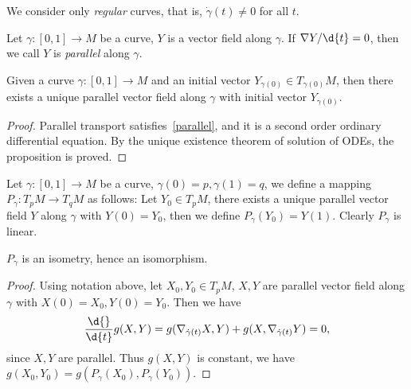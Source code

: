 \begin{rem}
    We consider only \emph{regular} curves, that is, $\dot\gamma(t)\neq 0$ for all $t$.
\end{rem}

\begin{defn}
    Let $\gamma:[0,1]\to M$ be a curve, $Y$ is a vector field along $\gamma$.
    If $\nabla Y/\d{t}=0$, then we call $Y$ is \emph{parallel} along $\gamma$.
\end{defn}

\begin{prop}\label{parallel transport!existence}
    Given a curve $\gamma:[0,1]\to M$ and an initial vector $Y_{\gamma(0)}\in T_{\gamma(0)}M$, then there exists a unique parallel vector field along $\gamma$ with initial vector $Y_{\gamma(0)}$.
\end{prop}
\begin{proof}
    Parallel transport satisfies~\eqref{parallel}, and it is a second order ordinary differential equation.
    By the unique existence theorem of solution of ODEs, the proposition is proved.
\end{proof}

\begin{defn}
    Let $\gamma:[0,1]\to M$ be a curve, $\gamma(0)=p,\gamma(1)=q$, we define a mapping $P_\gamma:T_pM\to T_qM$ as follows:
    Let $Y_0\in T_pM$, there exists a unique parallel vector field $Y$ along $\gamma$ with $Y(0)=Y_0$, then we define $P_\gamma(Y_0)=Y(1)$.
    Clearly $P_\gamma$ is linear.
\end{defn}

\begin{prop}
    $P_\gamma$ is an isometry, hence an isomorphism.
\end{prop}
\begin{proof}
    Using notation above, let $X_0,Y_0\in T_pM$, $X,Y$ are parallel vector field along $\gamma$ with $X(0)=X_0,Y(0)=Y_0$.
    Then we have
    \[\frac{\d{}}{\d{t}}g(X,Y)=g(\nabla_{\dot{\gamma}(t)}X,Y)+g(X,\nabla_{\dot{\gamma}(t)}Y)=0,\]
    since $X,Y$ are parallel.
    Thus $g(X,Y)$ is constant, we have $g(X_0,Y_0)=g(P_\gamma(X_0),P_\gamma(Y_0))$.
\end{proof}

